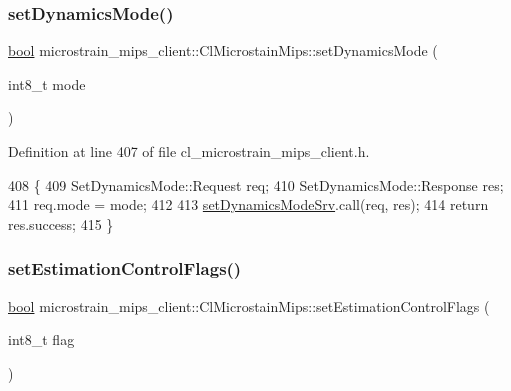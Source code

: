 \subsubsection{\texorpdfstring{set\+Dynamics\+Mode()}{setDynamicsMode()}}
{\footnotesize\ttfamily \hyperlink{classbool}{bool} microstrain\+\_\+mips\+\_\+client\+::\+Cl\+Microstain\+Mips\+::set\+Dynamics\+Mode (\begin{DoxyParamCaption}\item[{int8\+\_\+t}]{mode }\end{DoxyParamCaption})\hspace{0.3cm}{\ttfamily [inline]}}



Definition at line 407 of file cl\+\_\+microstrain\+\_\+mips\+\_\+client.\+h.


\begin{DoxyCode}
408     \{
409         SetDynamicsMode::Request req;
410         SetDynamicsMode::Response res;
411         req.mode = mode;
412 
413         \hyperlink{classmicrostrain__mips__client_1_1ClMicrostainMips_a2cf19dcbf3cd63d2ba3624cebb73c912}{setDynamicsModeSrv}.call(req, res);
414         \textcolor{keywordflow}{return} res.success;
415     \}
\end{DoxyCode}
\mbox{\label{classmicrostrain__mips__client_1_1ClMicrostainMips_a1ed2fa01f7363d9524a8436dfcd93dc4}} 
\subsubsection{\texorpdfstring{set\+Estimation\+Control\+Flags()}{setEstimationControlFlags()}}
{\footnotesize\ttfamily \hyperlink{classbool}{bool} microstrain\+\_\+mips\+\_\+client\+::\+Cl\+Microstain\+Mips\+::set\+Estimation\+Control\+Flags (\begin{DoxyParamCaption}\item[{int8\+\_\+t}]{flag }\end{DoxyParamCaption})\hspace{0.3cm}{\ttfamily [inline]}}



